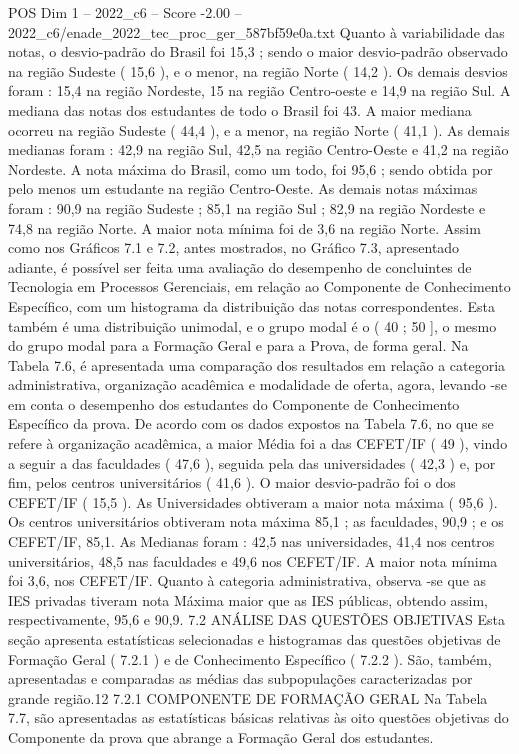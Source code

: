 \begin{textsample}{POS Dim 1 – 2022\_c6 – Score -2.00 – 2022\_c6/enade\_2022\_tec\_proc\_ger\_587bf59e0a.txt}
Quanto à variabilidade das notas, o desvio-padrão do Brasil foi 15,3 ; sendo o maior desvio-padrão observado na região Sudeste ( 15,6 ), e o menor, na região Norte ( 14,2 ).
Os demais desvios foram : 15,4 na região Nordeste, 15 na região Centro-oeste e 14,9 na região Sul.
A mediana das notas dos estudantes de todo o Brasil foi 43.
A maior mediana ocorreu na região Sudeste ( 44,4 ), e a menor, na região Norte ( 41,1 ).
As demais medianas foram : 42,9 na região Sul, 42,5 na região Centro-Oeste e 41,2 na região Nordeste.
A nota máxima do Brasil, como um todo, foi 95,6 ; sendo obtida por pelo menos um estudante na região Centro-Oeste.
As demais notas máximas foram : 90,9 na região Sudeste ; 85,1 na região Sul ; 82,9 na região Nordeste e 74,8 na região Norte.
A maior nota mínima foi de 3,6 na região Norte.
Assim como nos Gráficos 7.1 e 7.2, antes mostrados, no Gráfico 7.3, apresentado adiante, é possível ser feita uma avaliação do desempenho de concluintes de Tecnologia em Processos Gerenciais, em relação ao Componente de Conhecimento Específico, com um histograma da distribuição das notas correspondentes.
Esta também é uma distribuição unimodal, e o grupo modal é o ( 40 ; 50 ], o mesmo do grupo modal para a Formação Geral e para a Prova, de forma geral.
Na Tabela 7.6, é apresentada uma comparação dos resultados em relação a categoria administrativa, organização acadêmica e modalidade de oferta, agora, levando -se em conta o desempenho dos estudantes do Componente de Conhecimento Específico da prova.
De acordo com os dados expostos na Tabela 7.6, no que se refere à organização acadêmica, a maior Média foi a das CEFET/IF ( 49 ), vindo a seguir a das faculdades ( 47,6 ), seguida pela das universidades ( 42,3 ) e, por fim, pelos centros universitários ( 41,6 ).
O maior desvio-padrão foi o dos CEFET/IF ( 15,5 ).
As Universidades obtiveram a maior nota máxima ( 95,6 ).
Os centros universitários obtiveram nota máxima 85,1 ; as faculdades, 90,9 ; e os CEFET/IF, 85,1.
As Medianas foram : 42,5 nas universidades, 41,4 nos centros universitários, 48,5 nas faculdades e 49,6 nos CEFET/IF.
A maior nota mínima foi 3,6, nos CEFET/IF.
Quanto à categoria administrativa, observa -se que as IES privadas tiveram nota Máxima maior que as IES públicas, obtendo assim, respectivamente, 95,6 e 90,9. 7.2 ANÁLISE DAS QUESTÕES OBJETIVAS Esta seção apresenta estatísticas selecionadas e histogramas das questões objetivas de Formação Geral ( 7.2.1 ) e de Conhecimento Específico ( 7.2.2 ).
São, também, apresentadas e comparadas as médias das subpopulações caracterizadas por grande região.12 7.2.1 COMPONENTE DE FORMAÇÃO GERAL Na Tabela 7.7, são apresentadas as estatísticas básicas relativas às oito questões objetivas do Componente da prova que abrange a Formação Geral dos estudantes.

\end{textsample}
